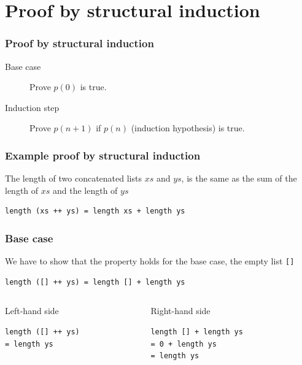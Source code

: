 \documentclass{beamer}
\begin{document}
\section{Proof by structural induction}

\begin{frame}[fragile]
\frametitle{Proof by structural induction}
 \begin{description}
 \item[Base case] Prove $p(0)$ is true.
 \item[Induction step] Prove $p(n+1)$ if $p(n)$ (induction hypothesis) is true.
 \end{description}
\end{frame}

\begin{frame}[fragile]
\frametitle{Example proof by structural induction}
The length of two concatenated lists $xs$ and $ys$, is the same as the sum of the length of $xs$ and the length of $ys$
\begin{verbatim}
length (xs ++ ys) = length xs + length ys
\end{verbatim}

\end{frame}

\begin{frame}[fragile]
\frametitle{Base case}
We have to show that the property holds for the base case, the empty list \verb|[]|
\begin{verbatim}
length ([] ++ ys) = length [] + length ys
\end{verbatim}
\begin{columns}
  \begin{column}{.5\textwidth}
    \begin{block}{Left-hand side}
      \begin{verbatim}
length ([] ++ ys)
= length ys
\end{verbatim}
    \end{block}
  \end{column}
  \begin{column}{.5\textwidth}
    \begin{block}{Right-hand side}
\begin{verbatim}
length [] + length ys   
= 0 + length ys
= length ys
\end{verbatim}
    \end{block}
  \end{column}
\end{columns}
\end{frame}
\end{document}
